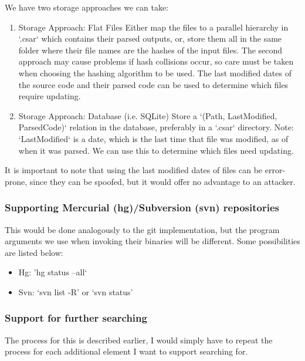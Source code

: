 \documentclass[12pt, letterpaper]{article}
\begin{document}
We have two storage approaches we can take:
\begin{enumerate}
  \item Storage Approach: Flat Files\newline
  Either map the files to a parallel hierarchy in `.csar` which contains their parsed outputs, or, store them all in the same folder where their file names are the hashes of the input files.
  The second approach may cause problems if hash collisions occur, so care must be taken when choosing the hashing algorithm to be used.
  The last modified dates of the source code and their parsed code can be used to determine which files require updating.
  \item Storage Approach: Database (i.e. SQLite)\newline
  Store a `(Path, LastModified, ParsedCode)` relation in the database, preferably in a `.csar` directory.
  Note: `LastModified` is a date, which is the last time that file was modified, as of when it was parsed.
  We can use this to determine which files need updating.
\end{enumerate}

It is important to note that using the last modified dates of files can be error-prone, since they can be spoofed, but it would offer no advantage to an attacker.

\subsubsection{Supporting Mercurial (hg)/Subversion (svn) repositories}
This would be done analogously to the git implementation, but the program arguments we use when invoking their binaries will be different.
Some possibilities are listed below:
\begin{itemize}
  \item Hg: 'hg status --all`
  \item Svn: `svn list -R' or `svn status'
\end{itemize}

\subsubsection{Support for further searching}
The process for this is described earlier, I would simply have to repeat the process for each additional element I want to support searching for.
\end{document}
